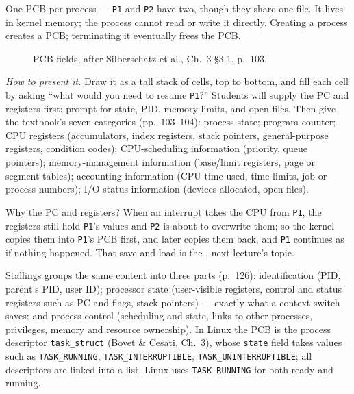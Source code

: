 \documentclass[11pt]{article}
\begin{document}
One PCB per process --- \texttt{P1} and \texttt{P2} have two, though they share one file. It lives in kernel memory; the process cannot read or write it directly. Creating a process creates a PCB; terminating it eventually frees the PCB.

\begin{figure}[h]
\centering
{}
\caption{PCB fields, after Silberschatz et al., Ch.~3 \S3.1, p.~103.}
\end{figure}

\emph{How to present it.} Draw it as a tall stack of cells, top to bottom, and fill each cell by asking ``what would you need to resume \texttt{P1}?'' Students will supply the PC and registers first; prompt for state, PID, memory limits, and open files. Then give the textbook's seven categories (pp.~103--104): process state; program counter; CPU registers (accumulators, index registers, stack pointers, general-purpose registers, condition codes); CPU-scheduling information (priority, queue pointers); memory-management information (base/limit registers, page or segment tables); accounting information (CPU time used, time limits, job or process numbers); I/O status information (devices allocated, open files).

Why the PC and registers? When an interrupt takes the CPU from \texttt{P1}, the registers still hold \texttt{P1}'s values and \texttt{P2} is about to overwrite them; so the kernel copies them into \texttt{P1}'s PCB first, and later copies them back, and \texttt{P1} continues as if nothing happened. That save-and-load is the , next lecture's topic.

Stallings groups the same content into three parts (p.~126): identification (PID, parent's PID, user ID); processor state (user-visible registers, control and status registers such as PC and flags, stack pointers) --- exactly what a context switch saves; and process control (scheduling and state, links to other processes, privileges, memory and resource ownership). In Linux the PCB is the process descriptor \texttt{task\_struct} (Bovet \& Cesati, Ch.~3), whose \texttt{state} field takes values such as \texttt{TASK\_RUNNING}, \texttt{TASK\_INTERRUPTIBLE}, \texttt{TASK\_UNINTERRUPTIBLE}; all descriptors are linked into a list. Linux uses \texttt{TASK\_RUNNING} for both ready and running.
\end{document}
